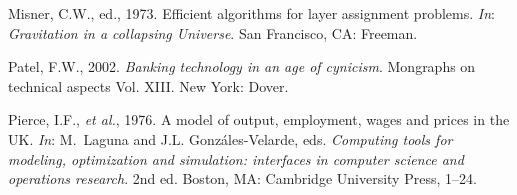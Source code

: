 \documentclass[]{tGIS2e}
\begin{document}
\begin{thebibliography}{9}
Misner, C.W., ed., 1973. Efficient algorithms for layer assignment problems. {\itshape{In}}:
  {\itshape Gravitation in a collapsing Universe}. San Francisco, CA:
  Freeman.

Patel, F.W., 2002. {\itshape Banking technology in an age of cynicism}. Mongraphs on
  technical aspects Vol. XIII. New York: Dover.

Pierce, I.F., {\itshape{et al.}}, 1976. A
  model of output, employment, wages and prices in the UK. {\itshape{In}}: M.~Laguna and
  J.L. Gonz\'{a}les-Velarde, eds. {\itshape Computing tools for modeling, optimization and simulation: interfaces in
  computer science and operations research}. 2nd  ed. Boston, MA: Cambridge University
  Press, 1--24.
\end{thebibliography}





\label{lastpage}
\end{document}
